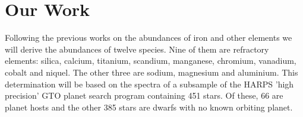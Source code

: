 \documentclass[dvips,12pt,a4paper]{report}
\begin{document}
{%






\section {Our Work}


Following the previous works on the abundances of iron and other elements we will derive the abundances of twelve species. Nine of them are refractory elements: silica, calcium, titanium, scandium, manganese, chromium, vanadium, cobalt and niquel. The other three are sodium, magnesium and aluminium. This determination will be based on the spectra of a subsample of the HARPS 'high precision' GTO planet search program containing 451 stars. Of these, 66 are planet hosts and the other 385 stars are dwarfs with no known orbiting planet. 

}
\end{document}

